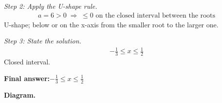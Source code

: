 \documentclass[11pt]{article}
\begin{document}
\textit{Step 2: Apply the U-shape rule.}
\[\begin{gathered}
a = 6 > 0 \;\Longrightarrow\; \leq 0 \text{ on the closed interval between the roots}
\end{gathered}\]
U-shape; below or on the x-axis from the smaller root to the larger one.

\textit{Step 3: State the solution.}
\[\begin{gathered}
-\tfrac{1}{3} \leq x \leq \tfrac{1}{2}
\end{gathered}\]
Closed interval.

\begin{answerbox}
\textbf{Final answer:}\quad \(\displaystyle -\tfrac{1}{3} \leq x \leq \tfrac{1}{2}\)
\end{answerbox}
\textbf{Diagram.}

\begin{center}
\end{center}
\end{document}
